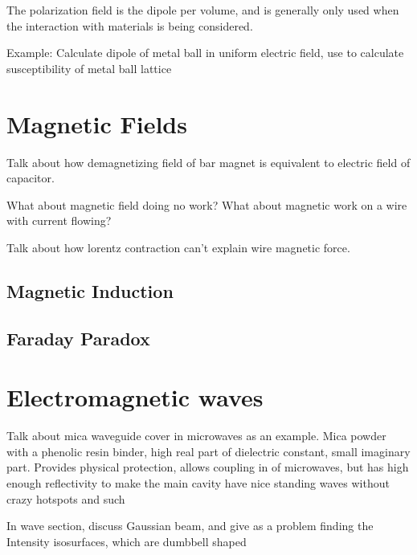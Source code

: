 \documentclass[12pt,a4paper,violet]{bbe}
\begin{document}
The polarization field is the dipole per volume, and is generally only used when the interaction with materials is being considered.

Example: Calculate dipole of metal ball in uniform electric field, use to calculate susceptibility of metal ball lattice


\chapter{Magnetic Fields}
Talk about how demagnetizing field of bar magnet is equivalent to electric field of capacitor.

What about magnetic field doing no work? What about magnetic work on a wire with current flowing?

Talk about how lorentz contraction can't explain wire magnetic force.

\section*{Magnetic Induction}

\section*{Faraday Paradox}



\chapter{Electromagnetic waves}
Talk about mica waveguide cover in microwaves as an example. Mica powder with a phenolic resin binder, high real part of dielectric constant, small imaginary part.
Provides physical protection, allows coupling in of microwaves, but has high enough reflectivity to make the main cavity have nice standing waves without crazy hotspots and such


In wave section, discuss Gaussian beam, and give as a problem finding the Intensity isosurfaces, which are dumbbell shaped

\blinddocument
\end{document}
